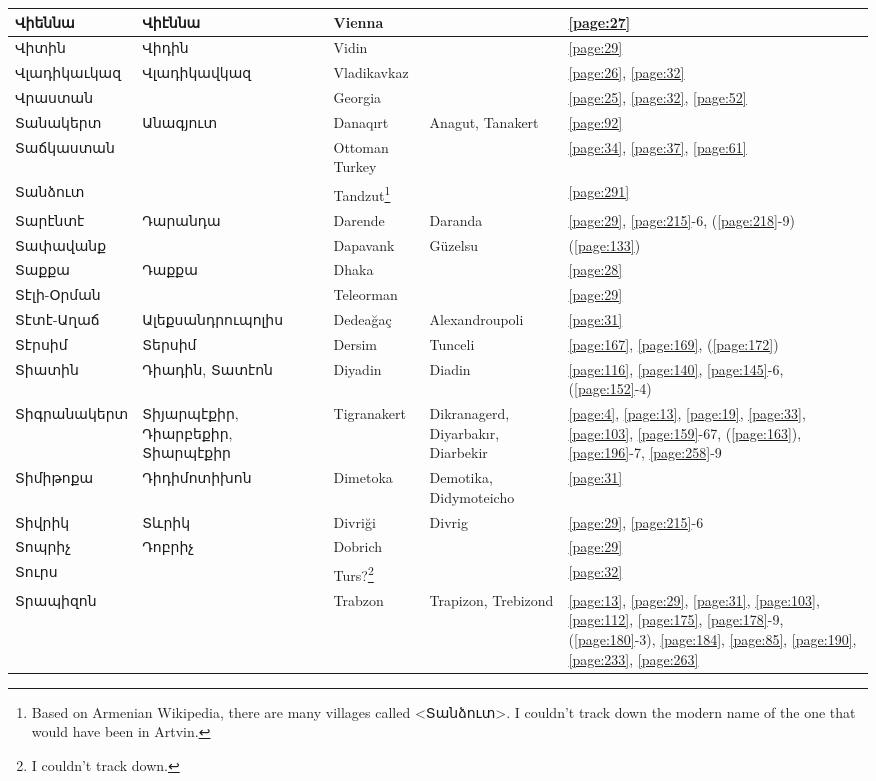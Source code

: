 \begin{center}
\begin{longtable}{|p{}|p{3cm}|p{3cm}|p{2cm}|p{3cm}|}
	Վիեննա&Վիէննա &Vienna & &\ref{page:27}\\ \hline
	Վիտին&Վիդին &Vidin & &\ref{page:29}\\ \hline
	Վլադիկաւկազ&Վլադիկավկազ &Vladikavkaz & &\ref{page:26}, \ref{page:32}\\ \hline
	Վրաստան& & Georgia& &\ref{page:25}, \ref{page:32}, \ref{page:52}\\ \hline
	Տանակերտ&Անագյուտ & Danaqırt    & Anagut, Tanakert&\ref{page:92}\\ \hline
	Տաճկաստան& &Ottoman Turkey & &\ref{page:34}, \ref{page:37}, \ref{page:61}\\ \hline
	Տանձուտ& & Tandzut\footnote{Based on Armenian Wikipedia, there are many villages called <Տանձուտ>. I couldn't track down the modern name of the one that would have been in Artvin.  }& &\ref{page:291}\\ \hline
	Տարէնտէ& Դարանդա& Darende& Daranda &\ref{page:29}, \ref{page:215}-6, (\ref{page:218}-9)\\ \hline
	Տափավանք& &  Dapavank& Güzelsu&(\ref{page:133})\\ \hline
	Տաքքա&Դաքքա &Dhaka & &\ref{page:28}\\ \hline
	Տէլի-Օրման& & Teleorman& &\ref{page:29}\\ \hline
	Տէտէ-Աղաճ& Ալեքսանդրուպոլիս&Dedeağaç &Alexandroupoli &\ref{page:31}\\ \hline
	Տէրսիմ&Տերսիմ &Dersim &Tunceli &\ref{page:167}, \ref{page:169}, (\ref{page:172})\\ \hline
	Տիատին&Դիադին, Տատէոն &Diyadin  &Diadin &\ref{page:116}, \ref{page:140}, \ref{page:145}-6, (\ref{page:152}-4)\\ \hline
	Տիգրանակերտ& Տիյարպէքիր, Դիարբեքիր, Տիարպէքիր& 
Tigranakert	&Dikranagerd, Diyarbakır,  Diarbekir &\ref{page:4}, \ref{page:13}, \ref{page:19}, \ref{page:33}, \ref{page:103}, \ref{page:159}-67, (\ref{page:163}), \ref{page:196}-7, \ref{page:258}-9\\ \hline
	Տիմիթոքա&Դիդիմոտիխոն & Dimetoka    &  Demotika, Didymoteicho &\ref{page:31}\\ \hline
	Տիվրիկ&   Տևրիկ& Divriği&Divrig &\ref{page:29}, \ref{page:215}-6\\ \hline
	Տոպրիչ&   Դոբրիչ &Dobrich & &\ref{page:29}\\ \hline
	Տուրս& &Turs?\footnote{I couldn't track down.} & &\ref{page:32}\\ \hline
	Տրապիզոն& &Trabzon &Trapizon, Trebizond &\ref{page:13}, \ref{page:29}, \ref{page:31}, \ref{page:103}, \ref{page:112}, \ref{page:175}, \ref{page:178}-9, (\ref{page:180}-3), \ref{page:184}, \ref{page:85}, \ref{page:190}, \ref{page:233}, \ref{page:263}\\ \hline

\end{longtable}
\end{center}
